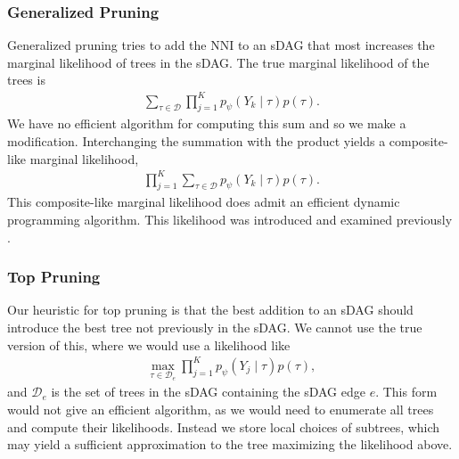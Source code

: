 \documentclass{article}
\newcommand{\citep}[1]{\cite{#1}}
\begin{document}
\subsubsection{Generalized Pruning}

Generalized pruning tries to add the NNI to an sDAG that most increases the marginal likelihood of trees in the sDAG.
The true marginal likelihood of the trees is
\begin{gather*}
\sum_{\tau\in\mathcal{D}}\prod_{j=1}^K p_{\psi}(Y_k\mid \tau)p(\tau).
\end{gather*}
We have no efficient algorithm for computing this sum and so we make a modification.
Interchanging the summation with the product yields a composite-like marginal likelihood,
\begin{gather}\label{eq:gpLikelihood}
\prod_{j=1}^K\sum_{\tau\in\mathcal{D}} p_{\psi}(Y_k\mid \tau)p(\tau).
\end{gather}
This composite-like marginal likelihood does admit an efficient dynamic programming algorithm. This likelihood was introduced and examined previously \citep{GP}.



\subsubsection{Top Pruning}

Our heuristic for top pruning is that the best addition to an sDAG should introduce the best tree not previously in the sDAG.
We cannot use the true version of this, where we would use a likelihood like
\begin{gather*}
\max_{\tau\in\mathcal{D}_e} \prod_{j=1}^K p_\psi(Y_j\mid \tau)p(\tau)
,
\end{gather*}
and $\mathcal{D}_e$ is the set of trees in the sDAG containing the sDAG edge $e$.
This form would not give an efficient algorithm, as we would need to enumerate all trees and compute their likelihoods.
Instead we store local choices of subtrees, which may yield a sufficient approximation to the tree maximizing the likelihood above.
\end{document}
